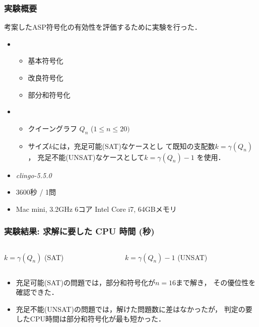 \documentclass[dvipdfmx,10pt]{beamer}
\begin{document}
%
%
\begin{frame}\frametitle{実験概要}
  \begin{block}{}\centering
    考案したASP符号化の有効性を評価するために実験を行った．    
  \end{block}
  \vfill
  \begin{itemize}
  \item {}
    \begin{itemize}
    \item 基本符号化
    \item 改良符号化
    \item 部分和符号化
    \end{itemize}
  \item {}
    \begin{itemize}
    \item クイーングラフ $Q_{n}$ \quad ($1 \leq n \leq 20)$
    \item サイズ$k$には，充足可能(\textsf{SAT})なケースとし
      て既知の支配数$k=\gamma(Q_{n})$，
      充足不能(\textsf{UNSAT})なケースとして$k=\gamma(Q_{n})-1$ を使用．
    \end{itemize}
  \item {} \textit{clingo-5.5.0}
  \item {} 3600秒 / 1問
  \item {} Mac mini, 3.2GHz 6コア Intel Core i7, 64GBメモリ
  \end{itemize}
\end{frame}


%
%

\begin{frame}\frametitle{実験結果: 求解に要した CPU 時間 (秒)}

 \begin{columns}
  \begin{column}{0.50\textwidth}
   \begin{table}[htbp]
     \caption{$k=\gamma(Q_{n})$ (\textsf{SAT})}
     \scalebox{0.7}{
    }
   \end{table}
  \end{column}
  \begin{column}{0.50\textwidth}
   \begin{table}[htbp]
     \caption{$k=\gamma(Q_{n})-1$ (\textsf{UNSAT})}
    \scalebox{0.7}{
    }
   \end{table}
  \end{column}
 \end{columns} 
 \begin{itemize}
 \item 充足可能(\textsf{SAT})の問題では，部分和符号化が$n=16$まで解き，
   その優位性を確認できた．
 \item 充足不能(\textsf{UNSAT})の問題では，解けた問題数に差はなかったが，
   判定の要したCPU時間は部分和符号化が最も短かった．
 \end{itemize}
\end{frame}
\end{document}
